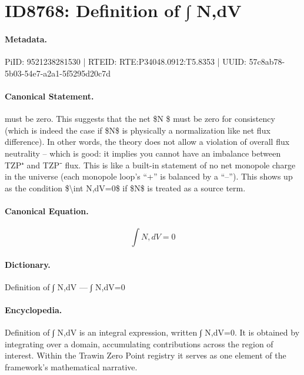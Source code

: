 \section*{ID8768: Definition of ∫ N,dV}
\paragraph{Metadata.}
PiID: 9521238281530 | RTEID: RTE:P34048.0912:T5.8353 | UUID: 57c8ab78-5b03-54e7-a2a1-5f5295d20c7d

\paragraph{Canonical Statement.}
must be zero. This suggests that the net \$N \$ must be zero for consistency (which is indeed the case if \$N\$ is physically a normalization like net flux difference). In other words, the theory does not allow a violation of overall flux neutrality – which is good: it implies you cannot have an imbalance between TZP⁺ and TZP⁻ flux. This is like a built-in statement of no net monopole charge in the universe (each monopole loop’s “+” is balanced by a “–”). This shows up as the condition \$\textbackslash{}int N,dV=0\$ if \$N\$ is treated as a source term.

\paragraph{Canonical Equation.}
\[
\int N,dV=0
\]

\paragraph{Dictionary.}
Definition of ∫ N,dV — ∫ N,dV=0

\paragraph{Encyclopedia.}
Definition of ∫ N,dV is an integral expression, written ∫ N,dV=0. It is obtained by integrating over a domain, accumulating contributions across the region of interest. Within the Trawin Zero Point registry it serves as one element of the framework's mathematical narrative.
